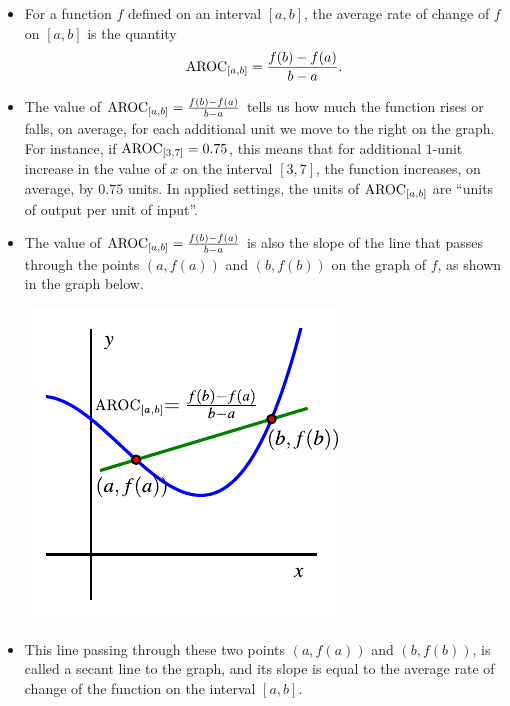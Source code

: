 \documentclass[nooutcomes]{ximera}
\begin{document}
\begin{exploration}
\begin{enumerate}[label=\alph*.]
\end{enumerate}
\end{exploration}

\begin{summary}\begin{itemize}
\item For a function $f$ defined on an interval $[a,b]$, the average rate of change of $f$ on $[a,b]$ is the quantity%
\begin{equation*}
\mathrm{AROC}_{[a,b]} = \frac{f(b) - f(a)}{b-a}\text{.}
\end{equation*}
\item The value of $\mathrm{AROC}_{[a,b]} = \frac{f(b) - f(a)}{b-a}$ tells us how much the function rises or falls, on average, for each additional unit we move to the right on the graph.  For instance, if $\mathrm{AROC}_{[3,7]} = 0.75$, this means that for additional $1$-unit increase in the value of $x$ on the interval $[3,7]$, the function increases, on average, by $0.75$ units.  In applied settings, the units of $\mathrm{AROC}_{[a,b]}$ are ``units of output per unit of input''.
\item The value of $\mathrm{AROC}_{[a,b]} = \frac{f(b) - f(a)}{b-a}$ is also the slope of the line that passes through the points $(a,f(a))$ and $(b,f(b))$ on the graph of $f$, as shown in the graph below.
\begin{image}
\includegraphics{aroc-f-x-defn.pdf}
\end{image}

\item This line passing through these two points $(a,f(a))$ and $(b,f(b))$, is called a secant line to the graph, and its slope is equal to the average rate of change of the function on the interval $[a,b]$.

\end{itemize}\end{summary}
\end{document}
